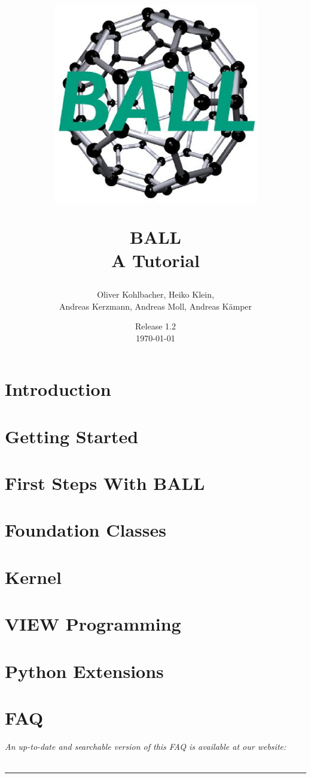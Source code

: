 \documentclass[12pt,twoside]{report}
\author{
  Oliver Kohlbacher, Heiko Klein,\\
  Andreas Kerzmann, Andreas Moll, Andreas K\"{a}mper
}
\title{
  \begin{center}
    \includegraphics[width=9cm]{logo.eps}
  \end{center}
  \Huge BALL\\ 
  \Large A Tutorial
}
\date{
  Release 1.2\\
  \today
}
\begin{document}
\setlength{\headheight}{14.5pt}
\setcounter{page}{1}
\maketitle
\cleardoublepage

\tableofcontents
\clearpage

\setcounter{page}{1}


\chapter{Introduction}
\label{chapter:introduction}



\chapter{Getting Started}
\label{chapter:getting-started}




\chapter{First Steps With BALL}
\label{chapter:first-steps}




\chapter{Foundation Classes}
\label{chapter:foundation-classes}




\chapter{Kernel}
\label{chapter:kernel}


\chapter{VIEW Programming}
\label{chapter:view-programming}


\chapter{Python Extensions}
\label{chapter:python}


\chapter{FAQ}
\label{chapter:faq}
\newpage
\noindent
{\it An up-to-date and searchable version of this FAQ is available at our website:\\
}\\
\hspace{1mm}
\rule{\textwidth}{0.1pt}
\hspace{3mm}



\newpage
{}
\small
\printindex
\normalsize

\renewcommand{\bibname}{References}


\end{document}
